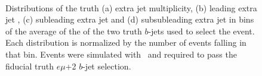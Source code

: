 \begin{figure}
\centering
{}
\\
\caption{Distributions of the truth (a) extra jet multiplicity, (b) leading extra jet \pt, (c) subleading extra jet \pt and (d) subsubleading extra jet \pt in bins of the average of the \pt of the two truth $b$-jets used to select the event. Each distribution is normalized by 
the number of events falling in that bin. Events were simulated with \powpy~\ttbar and required to pass the fiducial truth $e\mu$+2 $b$-jet selection.}
\label{fig:bjetdep}
\end{figure}


